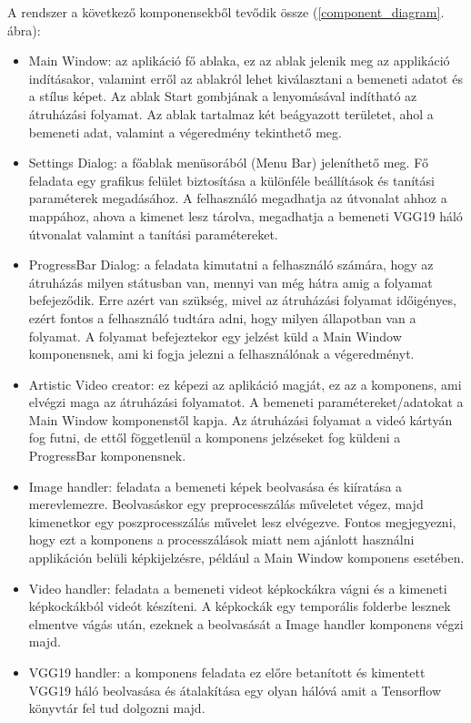\documentclass[12pt, a4paper, oneside]{book}
\theoremstyle{tetel}
\begin{document}
A rendszer a következő komponensekből tevődik össze (\ref{component_diagram}. ábra):
\begin{itemize}
	\item Main Window: az aplikáció fő ablaka, ez az ablak jelenik meg az applikáció indításakor, valamint erről az ablakról lehet kiválasztani a bemeneti adatot és a stílus képet. Az ablak Start gombjának a lenyomásával indítható az átruházási folyamat. Az ablak tartalmaz két beágyazott területet, ahol a bemeneti adat, valamint a végeredmény tekinthető meg.
	\item Settings Dialog: a főablak menüsorából (Menu Bar) jeleníthető meg. Fő feladata egy grafikus felület biztosítása a különféle beállítások és tanítási paraméterek megadásához. A felhasználó megadhatja az útvonalat ahhoz a mappához, ahova a kimenet lesz tárolva, megadhatja a bemeneti VGG19 háló útvonalat valamint a tanítási paramétereket.
	\item ProgressBar Dialog: a feladata kimutatni a felhasználó számára, hogy az átruházás milyen státusban van, mennyi van még hátra amig a folyamat befejeződik. Erre azért van szükség, mivel az átruházási folyamat időigényes, ezért fontos a felhasználó tudtára adni, hogy milyen állapotban van a folyamat. A folyamat befejeztekor egy jelzést küld a Main Window komponensnek, ami ki fogja jelezni a felhasználónak a végeredményt.
	\item Artistic Video creator: ez képezi az aplikáció magját, ez az a komponens, ami elvégzi maga az átruházási folyamatot. A bemeneti paramétereket/adatokat a Main Window komponenstől kapja. Az átruházási folyamat a videó kártyán fog futni, de ettől föggetlenül a komponens jelzéseket fog küldeni a ProgressBar komponensnek.
	\item Image handler: feladata a bemeneti képek beolvasása és kiíratása a merevlemezre. Beolvasáskor egy preprocesszálás műveletet végez, majd kimenetkor egy poszprocesszálás művelet lesz elvégezve. Fontos megjegyezni, hogy ezt a komponens a processzálások miatt nem ajánlott használni applikáción belüli képkijelzésre, például a Main Window komponens esetében.  
	\item Video handler: feladata a bemeneti videot képkockákra vágni és a kimeneti képkockákból videót készíteni. A képkockák egy temporális folderbe lesznek elmentve vágás után, ezeknek a beolvasását a Image handler komponens végzi majd.
	\item VGG19 handler: a komponens feladata ez előre betanított és kimentett VGG19 háló beolvasása és átalakítása egy olyan hálóvá amit a Tensorflow könyvtár fel tud dolgozni majd.
\end{itemize}
\end{document}

